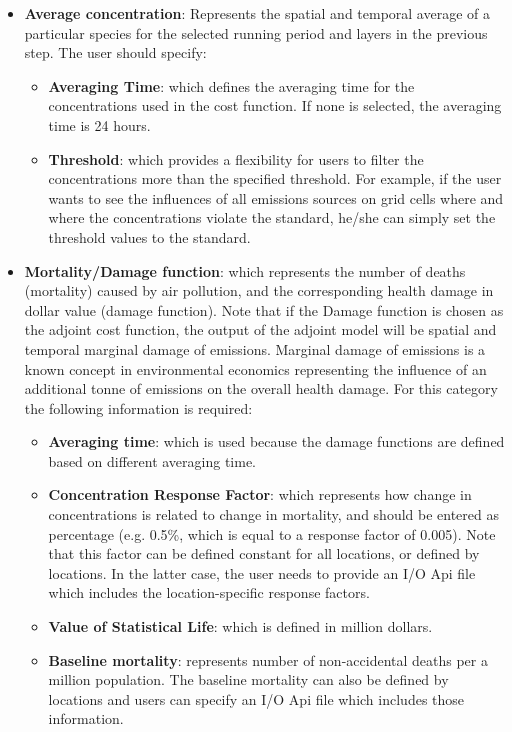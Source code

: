 \documentclass{article}
\begin{document}
\begin{itemize}
	\item \textbf{Average concentration}: Represents the spatial and temporal average of a particular species for the selected running period and layers in the previous step. The user should specify:
	\begin{itemize}
		\item \textbf{Averaging Time}: which defines the averaging time for the concentrations used in the cost function. If none is selected, the averaging time is 24 hours.
		\item \textbf{Threshold}: which provides a flexibility for users to filter the concentrations more than the specified threshold. For example, if the user wants to see the influences of all emissions sources on grid cells where and where the concentrations violate the standard, he/she can simply set the threshold values to the standard.
	\end{itemize}
	\item \textbf{Mortality/Damage function}: which represents the number of deaths (mortality) caused by air pollution, and the corresponding health damage in dollar value (damage function). Note that if the Damage function is chosen as the adjoint cost function, the output of the adjoint model will be spatial and temporal marginal damage of emissions. Marginal damage of emissions is a known concept in environmental economics representing the influence of an additional tonne of emissions on the overall health damage. For this category the following information is required:
	\begin{itemize}
	  \item \textbf{Averaging time}: which is used because the damage functions are defined based on different averaging time.
	  \item \textbf{Concentration Response Factor}: which represents how change in concentrations is related to change in mortality, and should be entered as percentage (e.g. 0.5\%, which is equal to a response factor of 0.005). Note that this factor can be defined constant for all locations, or defined by locations. In the latter case, the user needs to provide an I/O Api file which includes the location-specific response factors.
	  \item \textbf{Value of Statistical Life}: which is defined in million dollars.
	  \item \textbf{Baseline mortality}: represents number of non-accidental deaths per a million population. The baseline mortality can also be defined by locations and users can specify an I/O Api file which includes those information.

\end{itemize}
\end{itemize}
\end{document}
